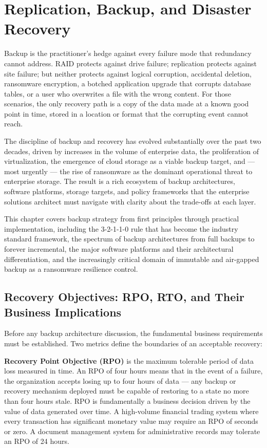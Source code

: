 \chapter{Replication, Backup, and Disaster Recovery}
\label{ch:11}

Backup is the practitioner's hedge against every failure mode that redundancy cannot address. RAID protects against drive failure; replication protects against site failure; but neither protects against logical corruption, accidental deletion, ransomware encryption, a botched application upgrade that corrupts database tables, or a user who overwrites a file with the wrong content. For those scenarios, the only recovery path is a copy of the data made at a known good point in time, stored in a location or format that the corrupting event cannot reach.

The discipline of backup and recovery has evolved substantially over the past two decades, driven by increases in the volume of enterprise data, the proliferation of virtualization, the emergence of cloud storage as a viable backup target, and --- most urgently --- the rise of ransomware as the dominant operational threat to enterprise storage. The result is a rich ecosystem of backup architectures, software platforms, storage targets, and policy frameworks that the enterprise solutions architect must navigate with clarity about the trade-offs at each layer.

This chapter covers backup strategy from first principles through practical implementation, including the 3-2-1-1-0 rule that has become the industry standard framework, the spectrum of backup architectures from full backups to forever incremental, the major software platforms and their architectural differentiation, and the increasingly critical domain of immutable and air-gapped backup as a ransomware resilience control.

\section{Recovery Objectives: RPO, RTO, and Their Business Implications}
Before any backup architecture discussion, the fundamental business requirements must be established. Two metrics define the boundaries of an acceptable recovery:

\textbf{Recovery Point Objective (RPO)} is the maximum tolerable period of data loss measured in time. An RPO of four hours means that in the event of a failure, the organization accepts losing up to four hours of data --- any backup or recovery mechanism deployed must be capable of restoring to a state no more than four hours stale. RPO is fundamentally a business decision driven by the value of data generated over time. A high-volume financial trading system where every transaction has significant monetary value may require an RPO of seconds or zero. A document management system for administrative records may tolerate an RPO of 24 hours.

